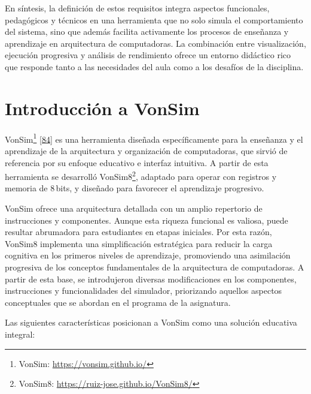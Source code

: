 \documentclass[12pt,oneside]{templates/unerthesis}
\begin{document}
En síntesis, la definición de estos requisitos integra aspectos funcionales, pedagógicos y técnicos en una herramienta que no solo simula el comportamiento del sistema, sino que además facilita activamente los procesos de enseñanza y aprendizaje en arquitectura de computadoras. La combinación entre visualización, ejecución progresiva y análisis de rendimiento ofrece un entorno didáctico rico que responde tanto a las necesidades del aula como a los desafíos de la disciplina.

\hypertarget{introducciuxf3n-a-vonsim}{%
\section{Introducción a VonSim}\label{introducciuxf3n-a-vonsim}}

VonSim\footnote{VonSim: \url{https://vonsim.github.io/}} \protect\hyperlink{ref-vonsim}{{[}84{]}} es una herramienta diseñada específicamente para la enseñanza y el aprendizaje de la arquitectura y organización de computadoras, que sirvió de referencia por su enfoque educativo e interfaz intuitiva. A partir de esta herramienta se desarrolló VonSim8\footnote{VonSim8: \url{https://ruiz-jose.github.io/VonSim8/}}, adaptado para operar con registros y memoria de 8\,bits, y diseñado para favorecer el aprendizaje progresivo.

VonSim ofrece una arquitectura detallada con un amplio repertorio de instrucciones y componentes. Aunque esta riqueza funcional es valiosa, puede resultar abrumadora para estudiantes en etapas iniciales. Por esta razón, VonSim8 implementa una simplificación estratégica para reducir la carga cognitiva en los primeros niveles de aprendizaje, promoviendo una asimilación progresiva de los conceptos fundamentales de la arquitectura de computadoras. A partir de esta base, se introdujeron diversas modificaciones en los componentes, instrucciones y funcionalidades del simulador, priorizando aquellos aspectos conceptuales que se abordan en el programa de la asignatura.

Las siguientes características posicionan a VonSim como una solución educativa integral:
\end{document}
